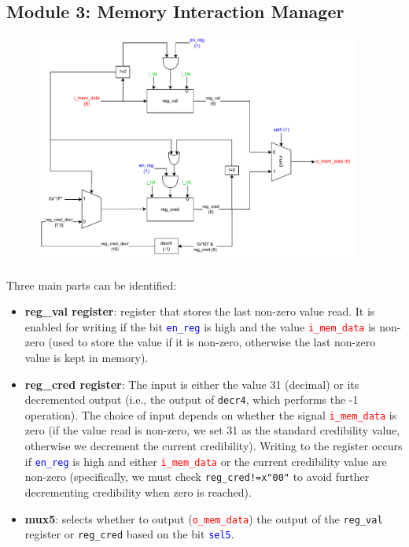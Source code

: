 \documentclass{article}
\begin{document}
\subsection{Module 3: Memory Interaction Manager}

\begin{figure}[H]
  \centering
  \includegraphics[width=0.95\textwidth]{modulo3.pdf}
  \label{fig:Module 3: Memory Interaction Manager}
\end{figure}

Three main parts can be identified:
\begin{itemize}
    \item \textbf{reg\_val register}: register that stores the last non-zero value read. It is enabled for writing if the bit \texttt{\textcolor{blue}{en\_reg}} is high and the value \texttt{\textcolor{red}{i\_mem\_data}} is non-zero (used to store the value if it is non-zero, otherwise the last non-zero value is kept in memory).
    \item \textbf{reg\_cred register}: The input is either the value 31 (decimal) or its decremented output (i.e., the output of \texttt{decr4}, which performs the -1 operation). The choice of input depends on whether the signal \texttt{\textcolor{red}{i\_mem\_data}} is zero (if the value read is non-zero, we set 31 as the standard credibility value, otherwise we decrement the current credibility). Writing to the register occurs if \texttt{\textcolor{blue}{en\_reg}} is high and either \texttt{\textcolor{red}{i\_mem\_data}} or the current credibility value are non-zero (specifically, we must check \texttt{reg\_cred!=x"00"} to avoid further decrementing credibility when zero is reached).
    \item \textbf{mux5}: selects whether to output (\texttt{\textcolor{red}{o\_mem\_data}}) the output of the \texttt{reg\_val} register or \texttt{reg\_cred} based on the bit \texttt{\textcolor{blue}{sel5}}.
\end{itemize}
\end{document}

